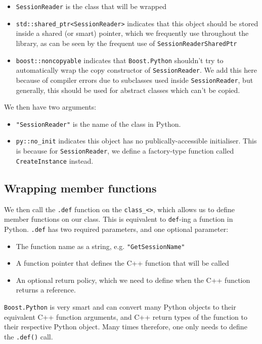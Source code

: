 \begin{itemize}
	\item \texttt{SessionReader} is the class that will be wrapped
	\item \texttt{std::shared\_ptr<SessionReader>} indicates that this object should be stored
		inside a shared (or smart) pointer, which we frequently use throughout the
  		library, as can be seen by the frequent use of \texttt{SessionReaderSharedPtr}
	\item \texttt{boost::noncopyable} indicates that \texttt{Boost.Python} shouldn't try to
  		automatically wrap the copy constructor of \texttt{SessionReader}. We add this here
  		because of compiler errors due to subclasses used inside \texttt{SessionReader}, but
  		generally, this should be used for abstract classes which can't be copied.
\end{itemize}

We then have two arguments:

\begin{itemize}
	\item \texttt{"SessionReader"} is the name of the class in Python.
	\item \texttt{py::no\_init} indicates this object has no publically-accessible
  		initialiser. This is because for \texttt{SessionReader}, we define a factory-type
  		function called \texttt{CreateInstance} instead.
\end{itemize}

\subsection{Wrapping member functions}

We then call the \texttt{.def} function on the \texttt{class\_<>}, which allows us to define
member functions on our class. This is equivalent to \texttt{def}-ing a function in
Python. \texttt{.def} has two required parameters, and one optional parameter:

\begin{itemize}
	\item The function name as a string, e.g. \texttt{"GetSessionName"}
	\item A function pointer that defines the C++ function that will be called
	\item An optional return policy, which we need to define when the C++ function
  		returns a reference.
\end{itemize}

\texttt{Boost.Python} is very smart and can convert many Python objects to their
equivalent C++ function arguments, and C++ return types of the function to their
respective Python object. Many times therefore, one only needs to define the
\texttt{.def()} call.

